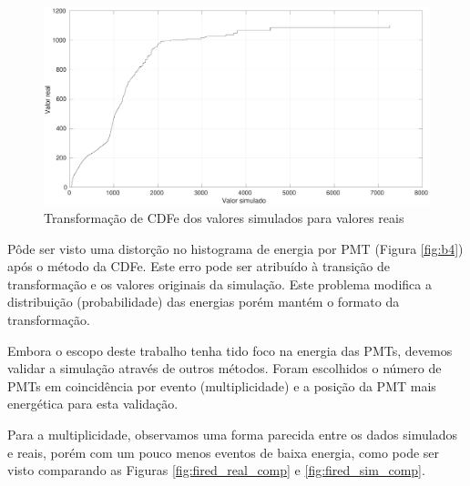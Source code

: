 \begin{figure}[H]
	\centering
	\includegraphics[width=16cm]{textuais/simulacao/figuras/transformacao.pdf}
	\caption{Transformação de CDFe dos valores simulados para valores reais }
	\label{fig:transf}
\end{figure}

Pôde ser visto uma distorção no histograma de energia por PMT (Figura \ref{fig:b4}) após o método da CDFe. Este erro pode ser atribuído à transição de transformação e os valores originais da simulação. Este problema modifica a distribuição (probabilidade) das energias porém mantém o formato da transformação.

Embora o escopo deste trabalho tenha tido foco na energia das PMTs, devemos validar a simulação através de outros métodos. Foram escolhidos o número de PMTs em coincidência por evento (multiplicidade) e a posição da PMT mais energética para esta validação.

Para a multiplicidade, observamos uma forma parecida entre os dados simulados e reais, porém com um pouco menos eventos de baixa energia, como pode ser visto comparando as Figuras \ref{fig:fired_real_comp} e \ref{fig:fired_sim_comp}. 


